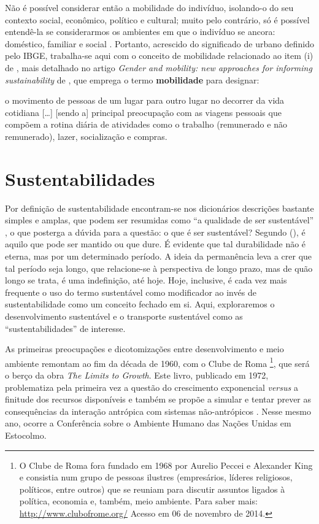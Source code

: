 \clearpage

Não é possível considerar então a mobilidade do indivíduo, isolando-o do seu contexto social, econômico, político e cultural; muito pelo contrário, só é possível entendê-la se considerarmos os ambientes em que o indivíduo se ancora: doméstico, familiar e social \cite{HANSON2010}. Portanto, acrescido do significado de urbano definido pelo IBGE, trabalha-se aqui com o conceito de mobilidade relacionado ao item (i) de , mais detalhado no artigo \emph{Gender and mobility: new approaches for informing sustainability} de , que emprega o termo \textbf{mobilidade} para designar:

\begin{citacao}
o movimento de pessoas de um lugar para outro lugar no decorrer da vida cotidiana [\ldots] [sendo a] principal preocupação com as viagens pessoais que compõem a rotina diária de atividades como o trabalho (remunerado e não remunerado), lazer, socialização e compras.
\cite[p.7]{HANSON2010}
\end{citacao} 


\clearpage
\section{Sustentabilidades}

Por definição de sustentabilidade encontram-se nos dicionários descrições bastante simples e amplas, que podem ser resumidas como ``a qualidade de ser sustentável'' \cite{MICHAELIS2014}, o que posterga a dúvida para a questão: o que é ser sustentável? Segundo  (\citeyear{BLACK2010}), é aquilo que pode ser mantido ou que dure. É evidente que tal durabilidade não é eterna, mas por um determinado período. A ideia da permanência leva a crer que tal período seja longo, que relacione-se à perspectiva de longo prazo, mas de quão longo se trata, é uma indefinição, até hoje. Hoje, inclusive, é cada vez mais frequente o uso do termo sustentável como modificador ao invés de sustentabilidade como um conceito fechado em si. Aqui, exploraremos o desenvolvimento  sustentável e o transporte sustentável como as ``sustentabilidades'' de interesse.

As primeiras preocupações e dicotomizações entre desenvolvimento e meio ambiente remontam ao fim da década de 1960, com o Clube de Roma%
\footnote{O Clube de Roma fora fundado em 1968 por Aurelio Peccei e Alexander King e consistia num grupo de pessoas ilustres (empresários, líderes religiosos, políticos, entre outros) que se reuniam para discutir assuntos ligados à política, economia e, também, meio ambiente. Para saber mais: \url{http://www.clubofrome.org/} Acesso em 06 de novembro de 2014.}, que será o berço da obra \emph{The Limits to Growth}. Este livro, publicado em 1972, problematiza pela primeira vez a questão do crescimento exponencial \emph{versus} a finitude dos recursos disponíveis e também se propõe a simular e tentar prever as consequências da interação antrópica com sistemas não-antrópicos \cite{MEADOWS1972}. Nesse mesmo ano, ocorre a Conferência sobre o Ambiente Humano das Nações Unidas em Estocolmo.

